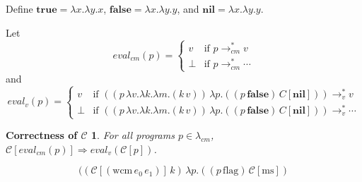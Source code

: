 \documentclass[ms,electronic,twosidetoc,letterpaper,chaptercenter,parttop]{byumsphd}
\begin{document}

Define $\textbf{true}=\lambda x.\lambda y.x$, $\textbf{false}=\lambda x.\lambda y.y$, and $\textbf{nil}=\lambda x.\lambda y.y$.

Let
\[
eval_{cm}(p)=\begin{cases}
v     &\text{if $p\rightarrow_{cm}^{*}v$}\\
\perp &\text{if $p\rightarrow_{cm}^{*}\cdots$}
\end{cases}
\]
and
\[
eval_{v}(p)=\begin{cases}
v     &\text{if $((p\,\lambda v.\lambda k.\lambda m.(k\,v))\,\lambda p.((p\,\textbf{false})\,C[\textbf{nil}]))\rightarrow_{v}^{*}v$}\\
\perp &\text{if $((p\,\lambda v.\lambda k.\lambda m.(k\,v))\,\lambda p.((p\,\textbf{false})\,C[\textbf{nil}]))\rightarrow_{v}^{*}\cdots$}
\end{cases}
\]


\newtheorem*{maintheorem}{Correctness of $\mathcal{C}$}
\begin{maintheorem}
For all programs $p\in\lambda_{cm}$, $\mathcal{C}[eval_{cm}(p)]\Rightarrow eval_{v}(\mathcal{C}[p])$.
\end{maintheorem}

\[
((\mathcal{C}[(\mathrm{wcm}\,e_0\,e_1)]\,k)\,\lambda p.((p\,\mathrm{flag})\,\mathcal{C}[\mathrm{ms}])
\]





% 


\end{document}
